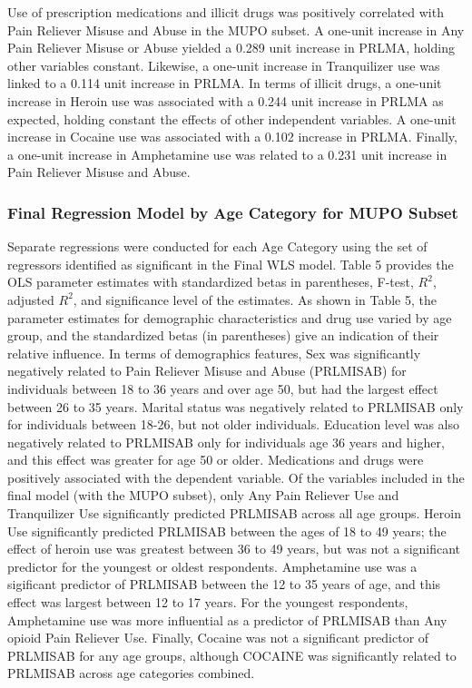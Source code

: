 \documentclass[sigconf]{acmart}
\begin{document}
Use of prescription medications and illicit drugs was positively correlated with 
Pain Reliever Misuse and Abuse in the MUPO subset. A one-unit increase in Any 
Pain Reliever Misuse or Abuse yielded a 0.289 unit increase in PRLMA, holding 
other variables constant. Likewise, a one-unit increase in Tranquilizer use was 
linked to a 0.114 unit increase in PRLMA. In terms of illicit drugs, a one-unit 
increase in Heroin use was associated with a 0.244 unit increase in PRLMA as 
expected, holding constant the effects of other independent variables. 
A one-unit increase in Cocaine use was associated with a 0.102 increase in PRLMA. 
Finally, a one-unit increase in Amphetamine use was related to a 0.231 unit 
increase in Pain Reliever Misuse and Abuse.  


\subsubsection{Final Regression Model by Age Category for MUPO Subset}

Separate regressions were conducted for each Age Category using the set of
regressors identified as significant in the Final WLS model. Table 5 provides 
the OLS parameter estimates with standardized betas in parentheses, F-test, 
$R^2$, adjusted $R^2$, and significance level of the estimates. As shown in 
Table 5, the parameter estimates for demographic characteristics and drug use 
varied by age group, and the standardized betas (in parentheses) give 
an indication of their relative influence. In terms of demographics features, 
Sex was significantly negatively related to Pain Reliever Misuse and Abuse 
(PRLMISAB) for individuals between 18 to 36 years and over age 50, but had the
largest effect between 26 to 35 years. Marital status was negatively related 
to PRLMISAB only for individuals between 18-26, but not older individuals. 
Education level was also negatively related to PRLMISAB only for individuals 
age 36 years and higher, and this effect was greater for age 50 or older. 
Medications and drugs were positively associated with the dependent variable. 
Of the variables included in the final model (with the MUPO subset), only Any 
Pain Reliever Use and Tranquilizer Use significantly predicted PRLMISAB across 
all age groups. Heroin Use significantly predicted PRLMISAB between the ages 
of 18 to 49 years; the effect of heroin use was greatest between 36 to 49
years, but was not a significant predictor for the youngest or oldest 
respondents. Amphetamine use was a sigificant predictor of PRLMISAB between
the 12 to 35 years of age, and this effect was largest between 12 to 17 years.
For the youngest respondents, Amphetamine use was more influential as a 
predictor of PRLMISAB than Any opioid Pain Reliever Use. Finally, Cocaine was 
not a significant predictor of PRLMISAB for any age groups, although 
COCAINE was significantly related to PRLMISAB across age categories combined. 
\end{document}
